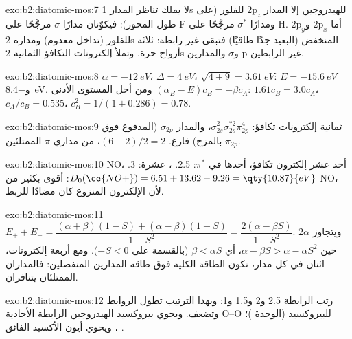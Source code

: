 \begin{solution}{exo:b2:diatomic-mos:7}
لا يملك تناظر المدار 1s للهيدروجين إلا المدار $2\mathrm p_z$ للفلور (على طول المحور):
فيكوّنان مدارًا $\sigma$ مرجَّحًا على F ومدارًا $\sigma^*$ مرجَّحًا على H. أما
$2\mathrm p_x$ و$2\mathrm p_y$ للفلور (تداخل معدوم) ومداره 2s المنخفض (البعيد جدًا طاقيًا)
فتبقى غير رابطة: ثلاثة أزواج حرة. وتملأ إلكترونات التكافؤ الثمانية 2s و$\sigma$
والمدارين p غير الرابطين.
\end{solution}

\begin{solution}{exo:b2:diatomic-mos:8}
$\bar\alpha = \qty{-12}{eV}$، $\Delta = \qty{4}{eV}$، $\sqrt{4 + 9} = \qty{3.61}{eV}$:
$E = \qty{-15.6}{eV}$ و\qty{-8.4}{eV}. ومن أجل المستوى الأدنى $(\alpha_B - E)c_B = -\beta
c_A$: $1.61c_B = 3.0c_A$، $c_A/c_B = 0.535$، $c_B^2 = 1/(1 + 0.286) = 0.78$.
\end{solution}

\begin{solution}{exo:b2:diatomic-mos:9}
ثمانية إلكترونات تكافؤ: $\sigma_{2s}^2\sigma_{2s}^{*2}\pi_{2p}^4$، والمدار $\sigma_{2p}$
(المدفوع فوق $\pi_{2p}$ بالمزج) فارغ.  $(6 - 2)/2 = 2$، من
مداري $\pi$ الممتلئين.
\end{solution}

\begin{solution}{exo:b2:diatomic-mos:10}
NO، أحد عشر إلكترون تكافؤ، أحدها في $\pi^*$:  2.5. ، عشرة: 
3. $D_0(\ce{NO+}) = 6.51 + 13.62 - 9.26 = \qty{10.87}{eV}$: أقوى بكثير من NO، لأن
الإلكترون المنزوع كان مضادًا للربط.
\end{solution}

\begin{solution}{exo:b2:diatomic-mos:11}
$E_+ + E_- = \dfrac{(\alpha + \beta)(1 - S) + (\alpha - \beta)(1 + S)}{1 - S^2} = \dfrac{2(\alpha -
\beta S)}{1 - S^2}$. ويتجاوز $2\alpha$ حين $\alpha - \beta S > \alpha - \alpha S^2$، أي
$\beta < \alpha S$ (بالقسمة على $-S < 0$). ومع أربعة إلكترونات، اثنان في كل مدار، تكون
الطاقة الكلية فوق طاقة المدارين المنفصلين: فالمداران الممتلئان يتنافران.
\end{solution}

\begin{solution}{exo:b2:diatomic-mos:12}
رتب الرابطة 2.5 و2 و1.5 و1: وبهذا الترتيب تطول الروابط وتضعف. ويحوي بيروكسيد
الهيدروجين الرابطة الأحادية O--O للبيروكسيد (الوحدة )؛ ويحوي 
أيون الأكسيد الفائق ، .
\end{solution}

